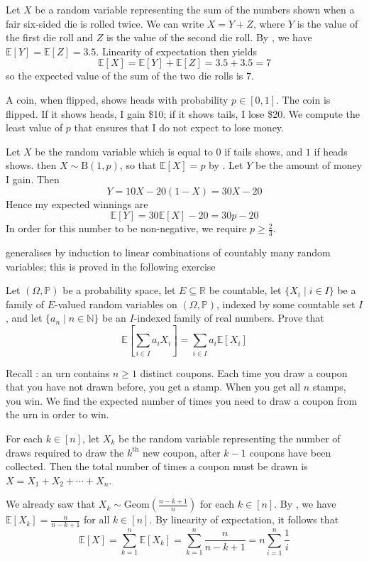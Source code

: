 \begin{example}
Let $X$ be a random variable representing the sum of the numbers shown when a fair six-sided die is rolled twice. We can write $X=Y+Z$, where $Y$ is the value of the first die roll and $Z$ is the value of the second die roll. By , we have $\mathbb{E}[Y]=\mathbb{E}[Z]=3.5$. Linearity of expectation then yields
\[ \mathbb{E}[X] = \mathbb{E}[Y]+\mathbb{E}[Z] = 3.5+3.5 = 7 \]
so the expected value of the sum of the two die rolls is $7$.
\end{example}

\begin{example}
A coin, when flipped, shows heads with probability $p \in [0,1]$. The coin is flipped. If it shows heads, I gain \$10; if it shows tails, I lose \$20. We compute the least value of $p$ that ensures that I do not expect to lose money.

Let $X$ be the random variable which is equal to $0$ if tails shows, and $1$ if heads shows. then $X \sim \mathrm{B}(1,p)$, so that $\mathbb{E}[X]=p$ by . Let $Y$ be the amount of money I gain. Then
\[ Y = 10X - 20(1-X) = 30X-20 \]
Hence my expected winnings are
\[ \mathbb{E}[Y] = 30\mathbb{E}[X] - 20 = 30p-20 \]
In order for this number to be non-negative, we require $p \ge \frac{2}{3}$.
\end{example}

 generalises by induction to linear combinations of countably many random variables; this is proved in the following exercise

\begin{exercise}
Let $(\Omega,\mathbb{P})$ be a probability space, let $E \subseteq \mathbb{R}$ be countable, let $\{ X_i \mid i \in I \}$ be a family of $E$-valued random variables on $(\Omega,\mathbb{P})$, indexed by some countable set $I$, and let $\{ a_n \mid n \in \mathbb{N} \}$ be an $I$-indexed family of real numbers. Prove that
\[ \mathbb{E} \left[ \sum_{i \in I} a_i X_i \right] = \sum_{i \in I} a_i\mathbb{E}[X_i] \]
\end{exercise}

\begin{example}
\label{exCoinCollectorExpectation}
Recall : an urn contains $n \ge 1$ distinct coupons. Each time you draw a coupon that you have not drawn before, you get a stamp. When you get all $n$ stamps, you win. We find the expected number of times you need to draw a coupon from the urn in order to win.

For each $k \in [n]$, let $X_k$ be the random variable representing the number of draws required to draw the $k^{\text{th}}$ new coupon, after $k-1$ coupons have been collected. Then the total number of times a coupon must be drawn is $X = X_1+X_2+\cdots+X_n$.

We already saw that $X_k \sim \mathrm{Geom}\left( \frac{n-k+1}{n} \right)$ for each $k \in [n]$. By , we have $\mathbb{E}[X_k] = \frac{n}{n-k+1}$ for all $k \in [n]$. By linearity of expectation, it follows that
\[ \mathbb{E}[X] = \sum_{k=1}^n \mathbb{E}[X_k] = \sum_{k=1}^n \frac{n}{n-k+1} = n \sum_{i=1}^n \frac{1}{i} \]
\end{example}